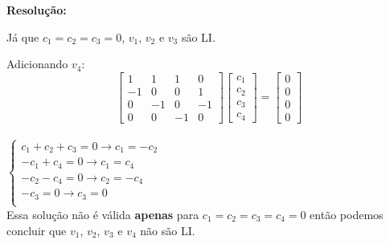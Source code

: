 \documentclass[leqno]{article}
\numberwithin{equation}{section}
\newenvironment{sol}
{
	\vspace{4mm}
	\noindent\textbf{Resolução:}
	\strut\newline
	\smallskip
	\hspace{-3.5mm}
}
{}
\begin{document}
\begin{enumerate}
\begin{sol}
		
		Já que $c_1 = c_2 = c_3 = 0$, $v_1$, $v_2$ e $v_3$ são LI.
		
		Adicionando $v_4$:\\
			$$\begin{bmatrix} 
				1 & 1 & 1 & 0\\
				-1 & 0 & 0 & 1\\
				0 & -1 & 0 & -1\\
				0 & 0 & -1 & 0\end{bmatrix}
			\begin{bmatrix} 
				c_1\\
				c_2\\
				c_3\\
				c_4
			\end{bmatrix} =
			\begin{bmatrix} 
				0\\
				0\\
				0\\
				0
			\end{bmatrix}$$ \\
		$
		\left\{
		\begin {array}{cl}
		c_1 + c_2 + c_3 = 0 \rightarrow c_1 = -c_2\\
		-c_1 + c_4 = 0 \rightarrow c_1 = c_4 \\
		-c_2 - c_4 = 0 \rightarrow c_2 = -c_4\\
		-c_3 = 0 \rightarrow c_3 = 0\\
		\end{array}
		\right.
		$\\
		
		Essa solução não é válida \textbf{apenas} para $c_1 = c_2 = c_3 = c_4 = 0$ então podemos concluir que $v_1$, $v_2$, $v_3$ e $v_4$ não são LI.\\


\end{sol}
\end{enumerate}
\end{document}
